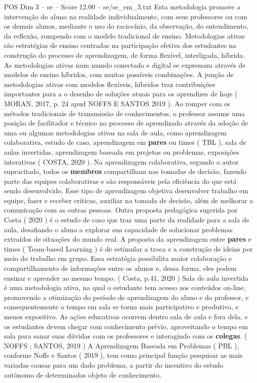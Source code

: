 \begin{textsample}{POS Dim 3 – se – Score 12.00 – se/se\_em\_3.txt}
Esta metodologia promove a intervenção do aluno na realidade individualmente, com seus professores ou com os demais alunos, mediante o uso do raciocínio, da observação, do entendimento, da reflexão, rompendo com o modelo tradicional de ensino.
Metodologias ativas são estratégias de ensino centradas na participação efetiva dos estudantes na construção do processo de aprendizagem, de forma flexível, interligada, híbrida.
As metodologias ativas num mundo conectado e digital se expressam através de modelos de ensino híbridos, com muitas possíveis combinações.
A junção de metodologias ativas com modelos flexíveis, híbridos traz contribuições importantes para a o desenho de soluções atuais para os aprendizes de hoje ( MORAN, 2017, p. 24 apud NOFFS E SANTOS 2019 ).
Ao romper com os métodos tradicionais de transmissão de conhecimentos, o professor assume uma posição de facilitador e técnico no processo de aprendizado através da adoção de uma ou algumas metodologias ativas na sala de aula, como aprendizagem colaborativa, estudo de caso, aprendizagem em \textbf{pares} ou times ( TBL ), sala de aulas invertidas, aprendizagem baseada em projetos ou problemas, exposições interativas ( COSTA, 2020 ).
Na aprendizagem colaborativa, segundo o autor supracitado, todos os \textbf{membros} compartilham nas tomadas de decisão, fazendo parte das equipes colaborativas e são responsáveis pela eficiência do que está sendo desenvolvido.
Esse tipo de aprendizagem objetiva desenvolver trabalho em equipe, fazer e receber críticas, auxiliar na tomada de decisão, além de melhorar a comunicação com as outras pessoas.
Outra proposta pedagógica sugerida por Costa ( 2020 ) é o estudo de caso que traz uma parte da realidade para a sala de aula, desafiando o aluno a explorar sua capacidade de solucionar problemas extraídos de situações do mundo real.
A proposta da aprendizagem entre \textbf{pares} e times ( Team-based Learning ) é de estimular a troca e a construção de ideias por meio do trabalho em grupo.
Essa estratégia possibilita maior colaboração e compartilhamento de informações entre os alunos e, dessa forma, eles podem ensinar e aprender ao mesmo tempo. ( Costa, p.41, 2020 ) Sala de aula invertida é uma metodologia ativa, na qual o estudante tem acesso aos conteúdos on-line, promovendo a otimização do período de aprendizagem do aluno e do professor, e consequentemente o tempo em sala se torna mais participativo e produtivo, e menos expositivo.
As ações educativas ocorrem dentro sala de aula e fora dela, e os estudantes devem chegar com conhecimento prévio, aproveitando o tempo em sala para sanar suas dúvidas com os professores e interagindo com os \textbf{colegas}. ( NOFFS ; SANTOS, 2019 ) A Aprendizagem Baseada em Problemas ( PBL ), conforme Noffs e Santos ( 2019 ), tem como principal função pesquisar as mais variadas causas para um dado problema, a partir do incentivo do estudo autônomo de determinados objeto de conhecimento.

\end{textsample}
